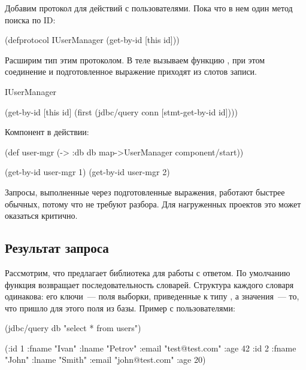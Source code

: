 Добавим протокол для действий с пользователями. Пока что в нем один метод поиска по ID:

\begin{english}
  \begin{clojure}
(defprotocol IUserManager
  (get-by-id [this id]))
  \end{clojure}
\end{english}

Расширим тип  этим протоколом. В теле  вызываем функцию , при этом соединение и подготовленное выражение приходят из слотов записи.

\begin{english}
  \begin{clojure}
IUserManager

(get-by-id [this id]
  (first (jdbc/query conn [stmt-get-by-id id])))
  \end{clojure}
\end{english}

Компонент в действии:

\begin{english}
  \begin{clojure}
(def user-mgr
  (-> {:db db}
      map->UserManager
      component/start))

(get-by-id user-mgr 1)
(get-by-id user-mgr 2)
  \end{clojure}
\end{english}

Запросы, выполненные через подготовленные выражения, работают быстрее обычных, потому что не требуют разбора. Для нагруженных проектов это может оказаться критично.

\subsection{Результат запроса}

Рассмотрим, что предлагает библиотека для работы с ответом. По умолчанию функция  возвращает последовательность словарей. Структура каждого словаря одинакова: его ключи~--- поля выборки, приведенные к типу , а значения~--- то, что пришло для этого поля из базы. Пример с пользователями:

\begin{english}
  \begin{clojure}
(jdbc/query db "select * from users")

({:id 1
  :fname "Ivan"
  :lname "Petrov"
  :email "test@test.com"
  :age 42}
 {:id 2
  :fname "John"
  :lname "Smith"
  :email "john@test.com"
  :age 20})
  \end{clojure}
\end{english}

